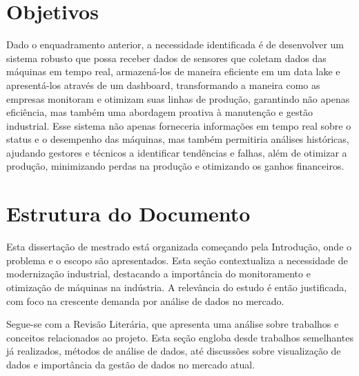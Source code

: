 \section{Objetivos}




Dado o enquadramento anterior, a necessidade identificada é de desenvolver um sistema robusto que possa receber dados de sensores que coletam dados das máquinas em tempo real, armazená-los de maneira eficiente em um data lake e apresentá-los através de um dashboard, transformando a maneira como as empresas monitoram e otimizam suas linhas de produção, garantindo não apenas eficiência, mas também uma abordagem proativa à manutenção e gestão industrial. Esse sistema não apenas forneceria informações em tempo real sobre o status e o desempenho das máquinas, mas também permitiria análises históricas, ajudando gestores e técnicos a identificar tendências e falhas, além de otimizar a produção, minimizando perdas na produção e otimizando os ganhos financeiros.

\section{Estrutura do Documento}
Esta dissertação de mestrado está organizada começando pela Introdução, onde o problema e o escopo são apresentados. Esta seção contextualiza a necessidade de modernização industrial, destacando a importância do monitoramento e otimização de máquinas na indústria. A relevância do estudo é então justificada, com foco na crescente demanda por análise de dados no mercado.

Segue-se com a Revisão Literária, que apresenta uma análise sobre trabalhos e conceitos relacionados ao projeto. Esta seção engloba desde trabalhos semelhantes já realizados, métodos de análise de dados, até discussões sobre visualização de dados e importância da gestão de dados no mercado atual.


